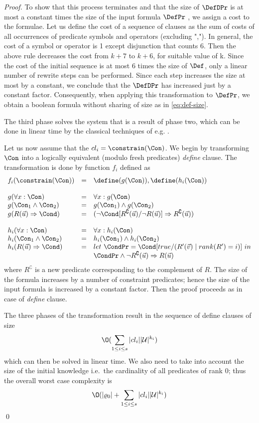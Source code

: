 \begin{proof}
  To show that this process terminates and that the size of $\DefDPr$ is
  at most a constant times the size of the input formula $\DefPr$ , we
  assign a cost to the formulae.  Let us define the cost of a sequence
  of clauses as the sum of costs of all occurrences of predicate
  symbols and operators (excluding ","). In general, the cost of
  a symbol or operator is 1 except disjunction that counts 6. Then the
  above rule decreases the cost from $k + 7$ to $k + 6$, for suitable
  value of k. Since the cost of the initial sequence is at most 6
  times the size of $\Def$, only a linear number of rewrite steps can
  be performed. Since each step increases the size at most by a
  constant, we conclude that the $\DefDPr$ has increased just by a
  constant factor. Consequently, when applying this transformation to
  $\DefPr$, we obtain a boolean formula without sharing of size as in
  \eqref{eq:def-size}.  

The third phase solves the system that is a
  result of phase two, which can be done in linear time by the
  classical techniques of e.g. \cite{bib:hornsat}.

Let us now assume that the $cl_i=\constrain(\Con)$. We begin by
transforming $\Con$ into a logically equivalent (modulo fresh
predicates) {\it define} clause. The transformation is done by
function $f_i$ defined as
$$
\begin{array}{lll}
  f_i(\constrain(\Con)) & = & \define(g(\Con)),\define(h_i(\Con)) \\ \\
  g (\forall x: \Con) & = & \forall x: g(\Con) \\
  g(\Con_1 \wedge \Con_2) & = & g(\Con_1) \wedge g(\Con_2) \\
  g (R(\vec u) \Rightarrow \Cond) & = & (\neg \Cond[R^\complement(\vec
  u) / \neg R(\vec u)] \Rightarrow R^\complement(\vec u)) \\ \\

  h_i(\forall x: \Con) & = & \forall x: h_i(\Con) \\
  h_i(\Con_1 \wedge \Con_2) & = & h_i(\Con_1) \wedge h_i(\Con_2) \\
  h_i (R(\vec u) \Rightarrow \Cond) & = & let\ \CondPr = \Cond[true / (R'(\vec v) \mid rank(R')=i)]\ in \\
  & & \CondPr \wedge \neg R^\complement(\vec u) \Rightarrow R(\vec u) \\
\end{array}
$$
where $R^\complement$ is a new predicate corresponding to the
complement of $R$. The size of the formula increases by a number of
constraint predicates; hence the size of the input formula is increased
by a constant factor. Then the proof proceeds as in case of {\it
  define} clause.

The three phases of the transformation result in the sequence of
define clauses of size
\[
\O(\sum_{1\leq i \leq s} |cl_i||\mathcal{U}|^{k_i})
\]
which can then be solved in linear time. We also need to take into
account the size of the initial knowledge i.e.~the cardinality of all
predicates of rank $0$; thus the overall worst case complexity is
\[
\O(|\varrho_0| + \sum_{1\leq i \leq s} |cl_i||\mathcal{U}|^{k_i})
\]
\qed
\end{proof}
